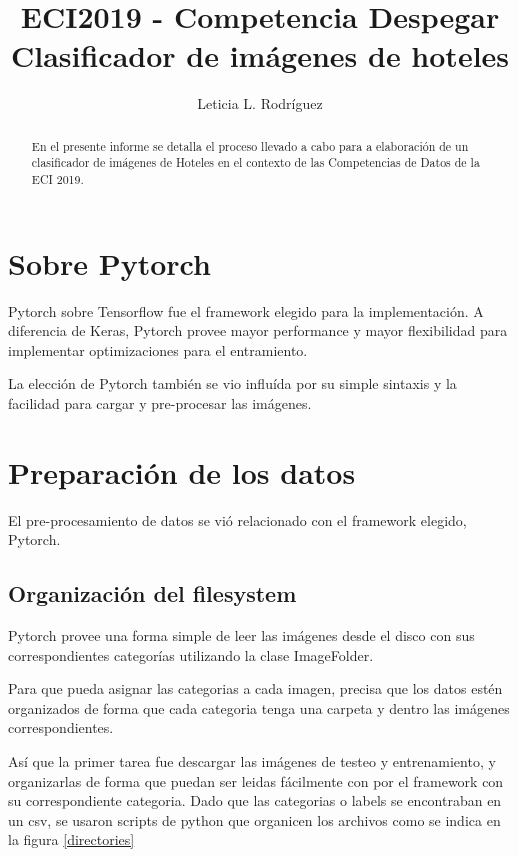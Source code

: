\documentclass{article}
\title{ECI2019 - Competencia Despegar \\ Clasificador de imágenes de hoteles}
\author{
  Leticia L. Rodríguez
}
\begin{document}
\maketitle

\begin{abstract}
En el presente informe se detalla el proceso llevado a cabo para a elaboración de un clasificador de imágenes de Hoteles en el contexto de las Competencias de Datos de la ECI 2019. 
\end{abstract}



\section{Sobre Pytorch}

Pytorch sobre Tensorflow fue el framework elegido para la implementación. A diferencia de Keras, Pytorch provee mayor performance y mayor flexibilidad para implementar optimizaciones para el entramiento. 

La elección de Pytorch también se vio influída por su simple sintaxis y la facilidad para cargar y pre-procesar las imágenes.

\section{Preparación de los datos}

El pre-procesamiento de datos se vió relacionado con el framework elegido, Pytorch.

\subsection{Organización del filesystem}

Pytorch provee una forma simple de leer las imágenes desde el disco con sus correspondientes categorías utilizando la clase ImageFolder. 

Para que pueda asignar las categorias a cada imagen, precisa que los datos estén organizados de forma que cada categoria tenga una carpeta y dentro las imágenes correspondientes. 

Así que la primer tarea fue descargar las imágenes de testeo y entrenamiento, y organizarlas de forma que puedan ser leidas fácilmente con por el framework con su correspondiente categoria. Dado que las categorias o labels se encontraban en un csv, se usaron scripts de python que organicen los archivos como se indica en la figura \ref{directories}
\end{document}

